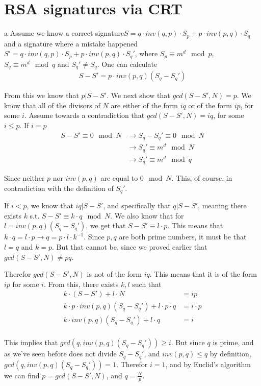 \documentclass{article}
\begin{document}
\section{RSA signatures via CRT}
\begin{paragraph}
    a Assume we know a correct signature\(S = q \cdot inv(q, p) \cdot S_p + p \cdot inv(p, q) \cdot S_q\) and a signature where a mistake happened \(S' = q \cdot inv(q, p) \cdot S_p + p \cdot inv(p, q) \cdot S_q'\), where \(S_p \equiv m^d \mod{p}\), \(S_q \equiv m^d \mod{q}\) and \(S_q' \neq S_q\). One can calculate
    \begin{align*}
        S - S' = p \cdot inv(p, q) (S_q - S_q')
    \end{align*}
    
    From this we know that \(p|S - S'\). We next show that \(gcd(S - S', N) = p\).
    We know that all of the divisors of \(N\) are either of the form \(iq\) or of the form \(ip\), for some \(i\). Assume towards a contradiction that \(gcd(S - S', N) = iq\), for some \(i \leq p\). If \(i = p\)
    \begin{align*}
        S - S' \equiv 0 \mod{N} &\rightarrow S_q - S_q' \equiv 0 \mod{N}\\
        &\rightarrow S_q' \equiv m^d \mod{N}\\
        &\rightarrow S_q' \equiv m^d \mod{q}
    \end{align*}
    
    Since neither \(p\) nor \(inv(p, q)\) are equal to \(0 \mod{N}\). This, of course, in contradiction with the definition of \(S_q'\).
    
    If \(i < p\), we know that \(iq|S - S'\), and specifically that \(q|S - S'\), meaning there exists \(k\) s.t. \(S - S' \equiv k \cdot q \mod{N}\). We also know that for \(l = inv(p, q) (S_q - S_q')\), we get that \(S - S' \equiv l \cdot p\). This means that \(k \cdot q = l \cdot p \rightarrow q = p \cdot l \cdot k^{-1}\). Since \(p, q\) are both prime numbers, it must be that \(l = q\) and \(k = p\). But that cannot be, since we proved earlier that \(gcd(S - S', N) \neq pq\).
    
    Therefor \(gcd(S - S', N)\) is not of the form \(iq\). This means that it is of the form \(ip\) for some \(i\). From this, there exists \(k, l\) such that
    \begin{align*}
        k \cdot (S - S') + l \cdot N &= ip\\
        k \cdot p \cdot inv(p, q) (S_q - S_q') + l \cdot p \cdot q &= i \cdot p\\
        k \cdot inv(p, q) (S_q - S_q') + l \cdot q &= i\\
    \end{align*}
    
    This implies that \(gcd(q, inv(p, q) (S_q - S_q')) \geq i\). But since \(q\) is prime, and as we've seen before does not divide \(S_q - S_q'\), and \(inv(p, q) \leq q\) by definition, \(gcd(q, inv(p, q) (S_q - S_q')) = 1\). Therefor \(i = 1\), and by Euclid's algorithm we can find \(p = gcd(S - S', N)\), and \(q = \frac{N}{p}\).
\end{paragraph}
\end{document}
